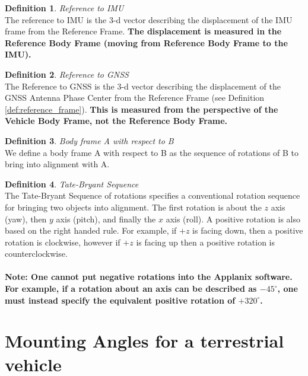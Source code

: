\documentclass[11pt]{article}
\theoremstyle{definition}
\newtheorem{defn}{Definition}[section]
\begin{document}
	
	\begin{defn}\label{def:ref_to_IMU}
		\textit{Reference to IMU}\\
		The reference to IMU is the 3-d vector describing the displacement of the IMU frame from the Reference Frame.  \textbf{The displacement is measured in the Reference Body Frame (moving from Reference Body Frame to the IMU).}
	\end{defn}
	
	\begin{defn}\label{def:ref_to_GNSS}
		\textit{Reference to GNSS}\\
		The Reference to GNSS is the 3-d vector describing the displacement of the GNSS Antenna Phase Center from the Reference Frame (see Definition \ref{def:reference_frame}).  \textbf{This is measured from the perspective of the Vehicle Body Frame, not the Reference Body Frame.}
		
	\end{defn}
	
	\begin{defn}\label{def:wrt}
		\textit{Body frame A with respect to B}\\
		We define a body frame A with respect to B as the sequence of rotations of B to bring into alignment with A.  
	\end{defn}
	
	\begin{defn}\label{def:tate_bryant}
		\textit{Tate-Bryant Sequence}\\
		The Tate-Bryant Sequence of rotations specifies a conventional rotation sequence for bringing two objects into alignment.  The first rotation is about the $z$ axis (yaw), then $y$ axis (pitch), and finally the $x$ axis (roll).  A positive rotation is also based on the right handed rule.  For example, if $+z$ is facing down, then a positive rotation is clockwise, however if $+z$ is facing up then a positive rotation is counterclockwise.\\\\
		\textbf{Note: One cannot put negative rotations into the Applanix software.  For example, if a rotation about an axis can be described as $-45^\circ$, one must instead specify the equivalent positive rotation of $+320^\circ$.} 
	\end{defn}
	
	\section{Mounting Angles for a terrestrial vehicle}\label{sec:mounting_truck}
	
\end{document}
